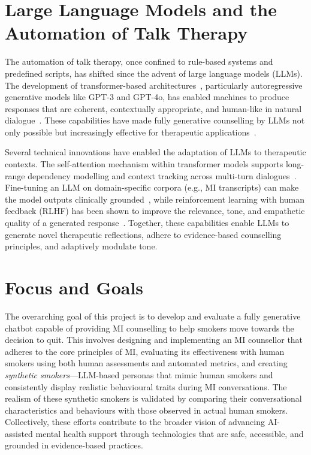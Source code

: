\section{Large Language Models and the Automation of Talk Therapy}
The automation of talk therapy, once confined to rule-based systems and predefined scripts, has shifted since the advent of large language models (LLMs). The development of transformer-based architectures~\cite{vaswani2017attention}, particularly autoregressive generative models like GPT-3 and GPT-4o, has enabled machines to produce responses that are coherent, contextually appropriate, and human-like in natural dialogue~\cite{openai2023gpt4}. These capabilities have made fully generative counselling by LLMs not only possible but increasingly effective for therapeutic applications~\cite{miner2020artificial, LEE2021856}.

Several technical innovations have enabled the adaptation of LLMs to therapeutic contexts. The self-attention mechanism within transformer models supports long-range dependency modelling and context tracking across multi-turn dialogues~\cite{vaswani2017attention}. Fine-tuning an LLM on domain-specific corpora (e.g., MI transcripts) can make the model outputs clinically grounded~\cite{kong2025llmtherapistssalespeopleevaluating}, while reinforcement learning with human feedback (RLHF) has been shown to improve the relevance, tone, and empathetic quality of a generated response~\cite{10.5555/3600270.3602281}. Together, these capabilities enable LLMs to generate novel therapeutic reflections, adhere to evidence-based counselling principles, and adaptively modulate tone.



\section{Focus and Goals}
The overarching goal of this project is to develop and evaluate a fully generative chatbot capable of providing MI counselling to help smokers move towards the decision to quit. This involves designing and implementing an MI counsellor that adheres to the core principles of MI, evaluating its effectiveness with human smokers using both human assessments and automated metrics, and creating \emph{synthetic smokers}---LLM-based personas that mimic human smokers and consistently display realistic behavioural traits during MI conversations. The realism of these synthetic smokers is validated by comparing their conversational characteristics and behaviours with those observed in actual human smokers. Collectively, these efforts contribute to the broader vision of advancing AI-assisted mental health support through technologies that are safe, accessible, and grounded in evidence-based practices.

